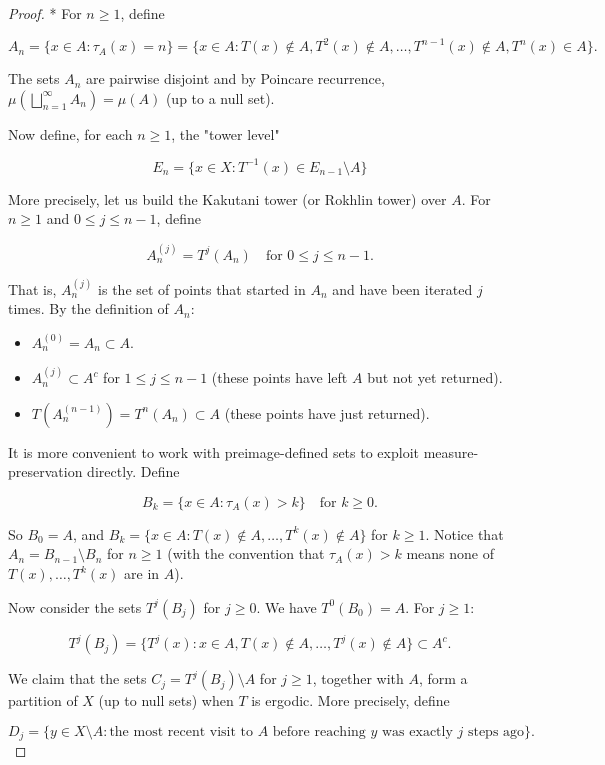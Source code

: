 \begin{proof}
* For $n \ge 1$, define

\[
A_n = \{x \in A : \tau_A(x) = n\} = \{x \in A : T(x) \notin A, T^2(x) \notin A, \ldots, T^{n-1}(x) \notin A, T^n(x) \in A\}.
\]

The sets $A_n$ are pairwise disjoint and by Poincare recurrence, $\mu(\bigsqcup_{n=1}^\infty A_n) = \mu(A)$ (up to a null set).

Now define, for each $n \ge 1$, the "tower level"

\[
E_n = \{x \in X : T^{-1}(x) \in E_{n-1} \setminus A\}
\]

More precisely, let us build the Kakutani tower (or Rokhlin tower) over $A$. For $n \ge 1$ and $0 \le j \le n-1$, define

\[
A_n^{(j)} = T^j(A_n) \quad \text{for } 0 \le j \le n-1.
\]

That is, $A_n^{(j)}$ is the set of points that started in $A_n$ and have been iterated $j$ times. By the definition of $A_n$:

\begin{itemize}[nosep]
  \item $A_n^{(0)} = A_n \subset A$.
  \item $A_n^{(j)} \subset A^c$ for $1 \le j \le n-1$ (these points have left $A$ but not yet returned).
  \item $T(A_n^{(n-1)}) = T^n(A_n) \subset A$ (these points have just returned).
\end{itemize}

It is more convenient to work with preimage-defined sets to exploit measure-preservation directly. Define

\[
B_k = \{x \in A : \tau_A(x) > k\} \quad \text{for } k \ge 0.
\]

So $B_0 = A$, and $B_k = \{x \in A : T(x) \notin A, \ldots, T^k(x) \notin A\}$ for $k \ge 1$. Notice that $A_n = B_{n-1} \setminus B_n$ for $n \ge 1$ (with the convention that $\tau_A(x) > k$ means none of $T(x), \ldots, T^k(x)$ are in $A$).

Now consider the sets $T^j(B_j)$ for $j \ge 0$. We have $T^0(B_0) = A$. For $j \ge 1$:

\[
T^j(B_j) = \{T^j(x) : x \in A, T(x) \notin A, \ldots, T^j(x) \notin A\} \subset A^c.
\]

We claim that the sets $C_j = T^j(B_j) \setminus A$ for $j \ge 1$, together with $A$, form a partition of $X$ (up to null sets) when $T$ is ergodic. More precisely, define

\[
D_j = \{y \in X \setminus A : \text{the most recent visit to } A \text{ before reaching } y \text{ was exactly } j \text{ steps ago}\}.
\]


\end{proof}
